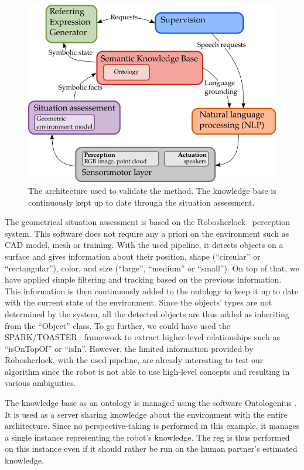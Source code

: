 \begin{figure}[ht!]
\centering
\includegraphics[scale=0.6]{figures/chapter4/architecture.png}
\caption{\label{fig:chap4_archi} The architecture used to validate the method. The knowledge base is continuously kept up to date through the situation assessment.}
\end{figure}

The geometrical situation assessment is based on the Robosherlock~\cite{beetz_2015_robosherlock} perception system. This software does not require any a priori on the environment such as CAD model, mesh or training. With the used pipeline, it detects objects on a surface and gives information about their position, shape (``circular'' or ``rectangular''), color, and size (``large'', ``medium'' or ``small''). On top of that, we have applied simple filtering and tracking based on the previous information. This information is then continuously added to the ontology to keep it up to date with the current state of the environment. Since the objects' types are not determined by the system, all the detected objects are thus added as inheriting from the ``Object'' class. To go further, we could have used the SPARK/TOASTER~\cite{milliez_2014_framework} framework to extract higher-level relationships such as ``isOnTopOf'' or ``isIn''. However, the limited information provided by Robosherlock, with the used pipeline, are already interesting to test our algorithm since the robot is not able to use high-level concepts and resulting in various ambiguities.

The knowledge base as an ontology is managed using the software Ontologenius \cite{sarthou_2019_ontologenius}. It is used as a server sharing knowledge about the environment with the entire architecture. Since no perspective-taking is performed in this example, it manages a single instance representing the robot's knowledge. The \acrshort{reg} is thus performed on this instance even if it should rather be run on the human partner's estimated knowledge.

